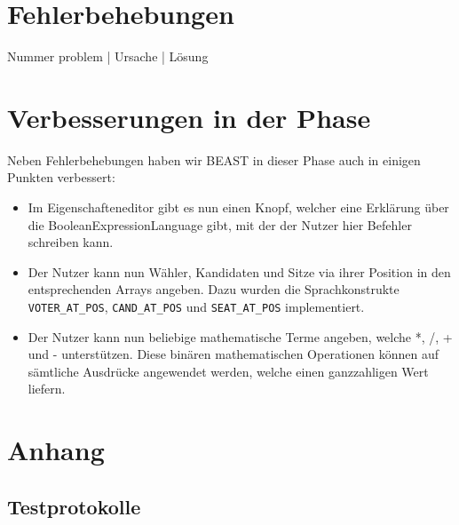 \documentclass[a4paper]{scrreprt}
\begin{document}
\chapter{Fehlerbehebungen}

Nummer problem | Ursache | Lösung




\chapter{Verbesserungen in der Phase}
Neben Fehlerbehebungen haben wir BEAST in dieser Phase auch in einigen Punkten
verbessert:

\begin{itemize}
  \item Im Eigenschafteneditor gibt es nun einen Knopf, welcher eine Erklärung
  über die BooleanExpressionLanguage gibt, mit der der Nutzer hier Befehler
  schreiben kann.
  \item Der Nutzer kann nun Wähler, Kandidaten und Sitze via ihrer Position in den entsprechenden Arrays angeben. Dazu wurden die Sprachkonstrukte \verb!VOTER_AT_POS!, \verb!CAND_AT_POS! und \verb!SEAT_AT_POS! implementiert.
  \item Der Nutzer kann nun beliebige mathematische Terme angeben, welche *, /, + und - unterstützen. Diese binären mathematischen Operationen können auf sämtliche Ausdrücke angewendet werden, welche einen ganzzahligen Wert liefern.
\end{itemize}

\chapter{Anhang}

\section{Testprotokolle}






\end{document}
